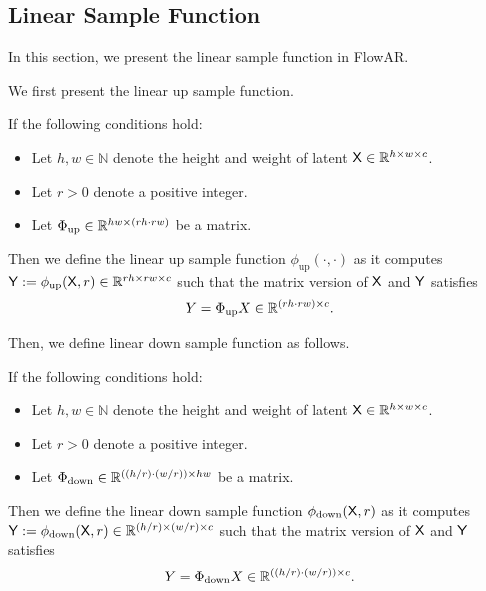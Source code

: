\subsection{Linear Sample Function}
In this section, we present the linear sample function in FlowAR.

We first present the linear up sample function.
\begin{definition}\label{def:linear_up_sample_function}
    If the following conditions hold:
    \begin{itemize}
        \item Let $h, w \in \mathbb{N}$ denote the height and weight of latent $\mathsf{X} \in \mathbb{R}^{h \times w \times c}$. 
        \item Let $r > 0$ denote a positive integer.
        \item Let $\Phi_{\mathrm{up}} \in \mathbb{R}^{hw \times (rh \cdot rw)}$ be a matrix. 
    \end{itemize}
    Then we define the linear up sample function $\phi_{\mathrm{up}}(\cdot, \cdot)$ as it computes $\mathsf{Y} := \phi_{\mathrm{up}}(\mathsf{X},r) \in \mathbb{R}^{rh \times rw \times c}$ such that the matrix version of $\mathsf{X}$ and $\mathsf{Y}$ satisfies
    \begin{align*}
        Y = \Phi_{\mathrm{up}}X \in \mathbb{R}^{(rh\cdot rw) \times c}.
    \end{align*}
\end{definition}

Then, we define linear down sample function as follows.
\begin{definition}\label{def:linear_down_sample_function}
    If the following conditions hold:
    \begin{itemize}
        \item Let $h, w \in \mathbb{N}$ denote the height and weight of latent $\mathsf{X} \in \mathbb{R}^{h \times w \times c}$.
        \item Let $r > 0$ denote a positive integer.
        \item Let $\Phi_{\mathrm{down}} \in \mathbb{R}^{((h/r) \cdot (w/r)) \times hw}$ be a matrix. 
    \end{itemize}
    Then we define the linear down sample function $\phi_{\mathrm{down}}(\mathsf{X},r)$ as it computes $\mathsf{Y} := \phi_{\mathrm{down}}(\mathsf{X},r) \in \mathbb{R}^{(h/r) \times (w/r) \times c}$ such that the matrix version of $\mathsf{X}$ and $\mathsf{Y}$ satisfies
    \begin{align*}
        Y = \Phi_{\mathrm{down}}X \in \mathbb{R}^{((h/r) \cdot (w/r)) \times c}.
    \end{align*}
\end{definition}



